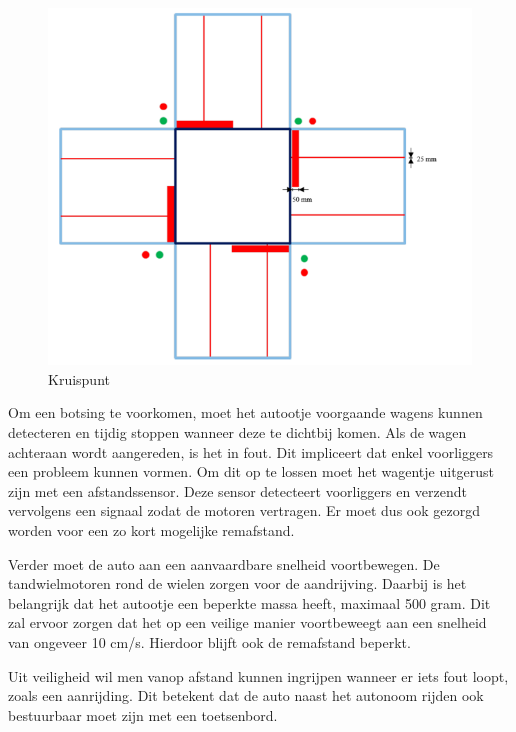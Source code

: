 \documentclass[a4paper,twoside,kulak]{kulakreport} %
\begin{document}

\begin{figure}
	\centering
	\includegraphics[width=.6\textwidth]{volglijnenEnStoplijnen}
	\caption{Kruispunt}
	\label{fig:plattegrond}
\end{figure}

Om een botsing te voorkomen, moet het autootje voorgaande wagens kunnen detecteren en tijdig stoppen wanneer deze te dichtbij komen. Als de wagen achteraan wordt aangereden, is het in fout. Dit impliceert dat enkel voorliggers een probleem kunnen vormen. Om dit op te lossen moet het wagentje uitgerust zijn met een afstandssensor. Deze sensor detecteert voorliggers en verzendt vervolgens een signaal zodat de motoren vertragen. Er moet dus ook gezorgd worden voor een zo kort mogelijke remafstand. %

Verder moet de auto aan een aanvaardbare snelheid voortbewegen. De tandwielmotoren rond de wielen zorgen voor de aandrijving. Daarbij is het belangrijk dat het autootje een beperkte massa heeft, maximaal 500 gram. Dit zal ervoor zorgen dat het op een veilige manier voortbeweegt aan een snelheid van ongeveer 10 cm/s. Hierdoor blijft ook de remafstand beperkt.

Uit veiligheid wil men vanop afstand kunnen ingrijpen wanneer er iets fout loopt, zoals een aanrijding. Dit betekent dat de auto naast het autonoom rijden ook bestuurbaar moet zijn met een toetsenbord. 



\end{document}
